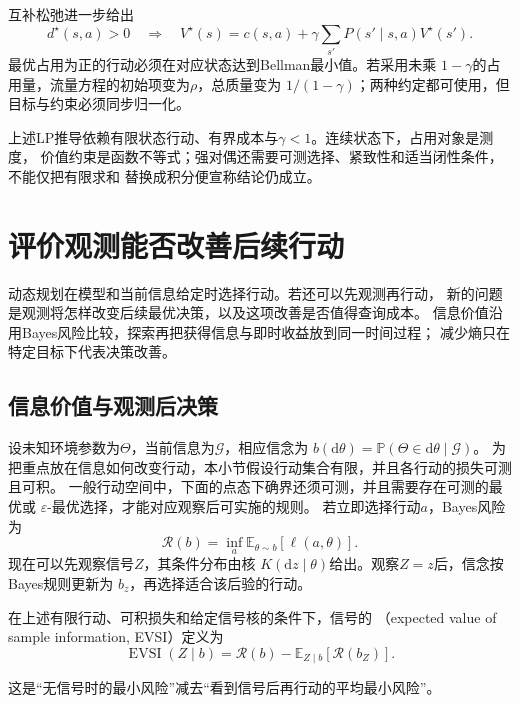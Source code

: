 互补松弛进一步给出
\[
  d^\star(s,a)>0
  \quad\Longrightarrow\quad
  V^\star(s)
  =
  c(s,a)+\gamma\sum_{s'}P(s'\mid s,a)V^\star(s').
\]
最优占用为正的行动必须在对应状态达到Bellman最小值。若采用未乘
\(1-\gamma\)的占用量，流量方程的初始项变为\(\rho\)，总质量变为
\(1/(1-\gamma)\)；两种约定都可使用，但目标与约束必须同步归一化。

上述LP推导依赖有限状态行动、有界成本与\(\gamma<1\)。连续状态下，占用对象是测度，
价值约束是函数不等式；强对偶还需要可测选择、紧致性和适当闭性条件，不能仅把有限求和
替换成积分便宣称结论仍成立。

\section{评价观测能否改善后续行动}
\label{sec:decision-value-of-information}

动态规划在模型和当前信息给定时选择行动。若还可以先观测再行动，
新的问题是观测将怎样改变后续最优决策，以及这项改善是否值得查询成本。
信息价值沿用Bayes风险比较，探索再把获得信息与即时收益放到同一时间过程；
减少熵只在特定目标下代表决策改善。

\subsection{信息价值与观测后决策}
设未知环境参数为\(\Theta\)，当前信息为\(\mathcal{G}\)，相应信念为
\(b(\mathrm{d}\theta)=\mathbb{P}(\Theta\in\mathrm{d}\theta\mid\mathcal{G})\)。
为把重点放在信息如何改变行动，本小节假设行动集合有限，并且各行动的损失可测且可积。
一般行动空间中，下面的点态下确界还须可测，并且需要存在可测的最优或
\(\varepsilon\)-最优选择，才能对应观察后可实施的规则。
若立即选择行动\(a\)，Bayes风险为
\[
  \mathcal{R}(b)
  =
  \inf_a
  \mathbb{E}_{\theta\sim b}[\ell(a,\theta)].
\]
现在可以先观察信号\(Z\)，其条件分布由核
\(K(\mathrm{d}z\mid\theta)\)给出。观察\(Z=z\)后，信念按Bayes规则更新为
\(b_z\)，再选择适合该后验的行动。
\begin{definition}[期望样本信息价值]
\label{def:decision-expected-sample-information-value}
在上述有限行动、可积损失和给定信号核的条件下，信号的
（expected value of sample information, EVSI）定义为
\begin{equation}
  \operatorname{EVSI}(Z\mid b)
  =
  \mathcal{R}(b)
  -
  \mathbb{E}_{Z\mid b}[\mathcal{R}(b_Z)].
  \label{eq:decision-evsi}
\end{equation}
\end{definition}
这是“无信号时的最小风险”减去“看到信号后再行动的平均最小风险”。


